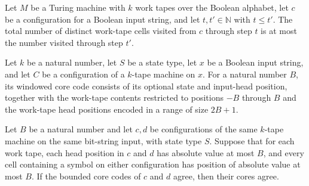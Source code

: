 \begin{lemma}
\label{Turing.MultiTapeTM.spaceUsed_mono}
\leanok
{}
Let $M$ be a Turing machine with $k$ work tapes over the Boolean alphabet, let $c$ be a
configuration for a Boolean input string, and let $t,t'\in\mathbb{N}$ with $t\le t'$.
The total number of distinct work-tape cells visited from $c$ through step $t$ is at
most the number visited through step $t'$.
\end{lemma}

\begin{lemma}
\label{Turing.MultiTapeTM.ConfigCount.coreCode}
\leanok
{}
Let $k$ be a natural number, let $S$ be a state type, let $x$ be a Boolean input string,
and let $C$ be a configuration of a $k$-tape machine on $x$. For a natural number $B$,
its windowed core code consists of its optional state and input-head position, together
with the work-tape contents restricted to positions $-B$ through $B$ and the work-tape
head positions encoded in a range of size $2B+1$.
\end{lemma}

\begin{lemma}
\label{Turing.MultiTapeTM.ConfigCount.coreCode_inj}
\leanok
{}
Let $B$ be a natural number and let $c,d$ be configurations of the same $k$-tape machine
on the same bit-string input, with state type $S$. Suppose that for each work tape, each
head position in $c$ and $d$ has absolute value at most $B$, and every cell containing a
symbol on either configuration has position of absolute value at most $B$. If the
bounded core codes of $c$ and $d$ agree, then their cores agree.
\end{lemma}

